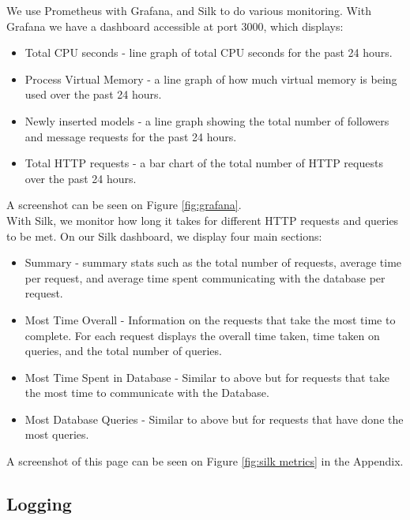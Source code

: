 We use Prometheus with Grafana, and Silk to do various monitoring. With Grafana we have a dashboard accessible at port 3000, which displays:
\begin{itemize}
    \item Total CPU seconds - line graph of total CPU seconds for the past 24 hours.
    
    \item Process Virtual Memory - a line graph of how much virtual memory is being used over the past 24 hours.
    
    \item Newly inserted models - a line graph showing the total number of followers and message requests for the past 24 hours.
    
    \item Total HTTP requests - a bar chart of the total number of HTTP requests over the past 24 hours.
\end{itemize}
A screenshot can be seen on Figure \ref{fig:grafana}.\\
\newpage
With Silk, we monitor how long it takes for different HTTP requests and queries to be met. On our Silk dashboard, we display four main sections:

\begin{itemize}
    \item Summary - summary stats such as the total number of requests, average time per request, and average time spent communicating with the database per request.
    
    \item Most Time Overall - Information on the requests that take the most time to complete. For each request displays the overall time taken, time taken on queries, and the total number of queries.

    \item Most Time Spent in Database - Similar to above but for requests that take the most time to communicate with the Database.

    \item Most Database Queries - Similar to above but for requests that have done the most queries.
\end{itemize}

A screenshot of this page can be seen on Figure \ref{fig:silk metrics} in the Appendix.

\subsection*{Logging}

